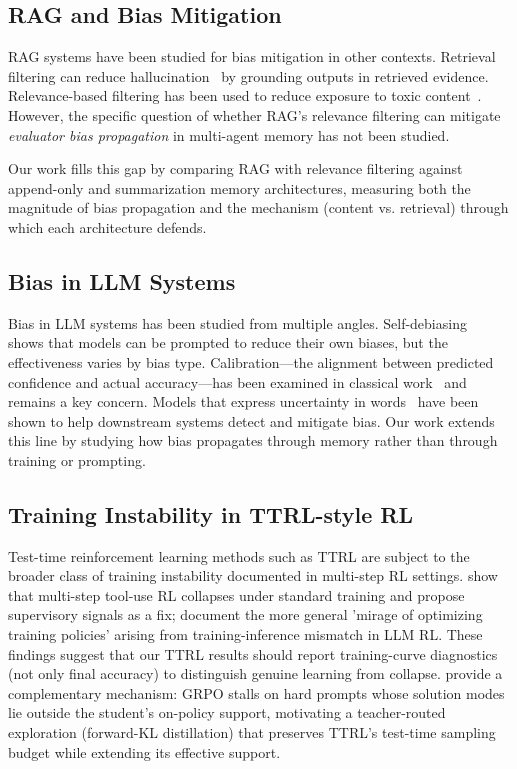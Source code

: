 \documentclass[11pt]{article}
\begin{document}
\subsection{RAG and Bias Mitigation}

RAG systems have been studied for bias mitigation in other contexts. Retrieval filtering can reduce hallucination~\cite{gao2024retrieval} by grounding outputs in retrieved evidence. Relevance-based filtering has been used to reduce exposure to toxic content~\cite{gehman2020realtoxicityprompts}. However, the specific question of whether RAG's relevance filtering can mitigate \emph{evaluator bias propagation} in multi-agent memory has not been studied.

Our work fills this gap by comparing RAG with relevance filtering against append-only and summarization memory architectures, measuring both the magnitude of bias propagation and the mechanism (content vs. retrieval) through which each architecture defends.

\subsection{Bias in LLM Systems}

Bias in LLM systems has been studied from multiple angles. Self-debiasing~\cite{schick2021debiasing} shows that models can be prompted to reduce their own biases, but the effectiveness varies by bias type. Calibration---the alignment between predicted confidence and actual accuracy---has been examined in classical work~\cite{guo2017calibration,kadavath2022language} and remains a key concern. Models that express uncertainty in words~\cite{lin2022teach} have been shown to help downstream systems detect and mitigate bias. Our work extends this line by studying how bias propagates through memory rather than through training or prompting.

\subsection{Training Instability in TTRL-style RL}

Test-time reinforcement learning methods such as TTRL are subject to the broader class of training instability documented in multi-step RL settings. \citet{hao2026tooluse} show that multi-step tool-use RL collapses under standard training and propose supervisory signals as a fix; \citet{liang2026mirage} document the more general 'mirage of optimizing training policies' arising from training-inference mismatch in LLM RL. These findings suggest that our TTRL results should report training-curve diagnostics (not only final accuracy) to distinguish genuine learning from collapse. \citet{xu2026trek} provide a complementary mechanism: GRPO stalls on hard prompts whose solution modes lie outside the student's on-policy support, motivating a teacher-routed exploration (forward-KL distillation) that preserves TTRL's test-time sampling budget while extending its effective support.
\end{document}
